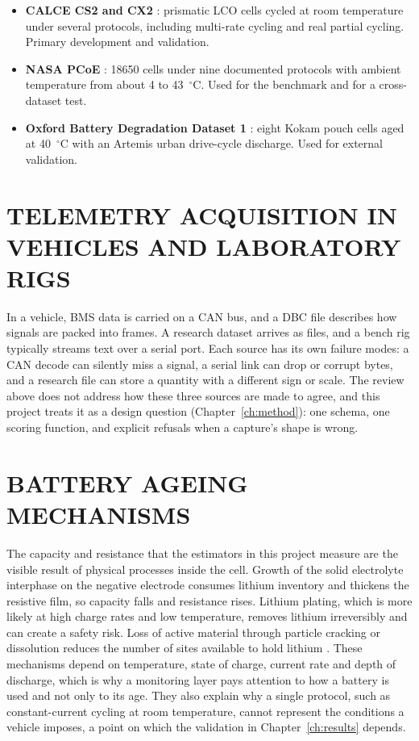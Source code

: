 \begin{itemize}
    \item \textbf{CALCE CS2 and CX2} \cite{calce}: prismatic LCO cells cycled at room temperature under several protocols, including multi-rate cycling and real partial cycling. Primary development and validation.
    \item \textbf{NASA PCoE} \cite{saha2007}: 18650 cells under nine documented protocols with ambient temperature from about 4 to 43~$^\circ$C. Used for the benchmark and for a cross-dataset test.
    \item \textbf{Oxford Battery Degradation Dataset 1} \cite{howey2017oxford,birkl2017thesis}: eight Kokam pouch cells aged at 40~$^\circ$C with an Artemis urban drive-cycle discharge. Used for external validation.
\end{itemize}

\section{TELEMETRY ACQUISITION IN VEHICLES AND LABORATORY RIGS}

In a vehicle, BMS data is carried on a CAN bus, and a DBC file describes how signals are packed into frames. A research dataset arrives as files, and a bench rig typically streams text over a serial port. Each source has its own failure modes: a CAN decode can silently miss a signal, a serial link can drop or corrupt bytes, and a research file can store a quantity with a different sign or scale. The review above does not address how these three sources are made to agree, and this project treats it as a design question (Chapter~\ref{ch:method}): one schema, one scoring function, and explicit refusals when a capture's shape is wrong.

\section{BATTERY AGEING MECHANISMS}

The capacity and resistance that the estimators in this project measure are the visible result of physical processes inside the cell. Growth of the solid electrolyte interphase on the negative electrode consumes lithium inventory and thickens the resistive film, so capacity falls and resistance rises. Lithium plating, which is more likely at high charge rates and low temperature, removes lithium irreversibly and can create a safety risk. Loss of active material through particle cracking or dissolution reduces the number of sites available to hold lithium \cite{vetter2005,barre2013}. These mechanisms depend on temperature, state of charge, current rate and depth of discharge, which is why a monitoring layer pays attention to how a battery is used and not only to its age. They also explain why a single protocol, such as constant-current cycling at room temperature, cannot represent the conditions a vehicle imposes, a point on which the validation in Chapter~\ref{ch:results} depends.

